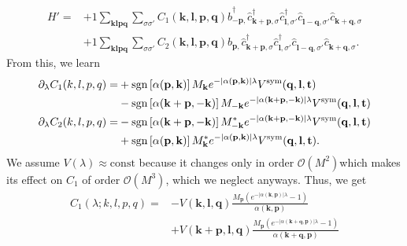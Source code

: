 \begin{align*}
	H'= 	&+1 \sum_{ \mathbf{k} \mathbf{l} \mathbf{p} \mathbf{q} } \sum_{ \sigma \sigma' } C_1( \mathbf{k}, \mathbf{l}, \mathbf{p}, \mathbf{q} )   \hat{b}_{ -\mathbf{p}, }^\dagger  \hat{c}_{ \mathbf{k}+\mathbf{p}, \sigma }^\dagger  \hat{c}_{ \mathbf{l}, \sigma' }^\dagger  \hat{c}_{ \mathbf{l}-\mathbf{q}, \sigma' }^{\phantom{\dagger}} \hat{c}_{ \mathbf{k}+\mathbf{q}, \sigma }^{\phantom{\dagger}}  \\
	&+1 \sum_{ \mathbf{k} \mathbf{l} \mathbf{p} \mathbf{q} } \sum_{ \sigma \sigma' } C_2( \mathbf{k}, \mathbf{l}, \mathbf{p}, \mathbf{q} )   \hat{b}_{ \mathbf{p}, }^{\phantom{\dagger}} \hat{c}_{ \mathbf{k}+\mathbf{p}, \sigma }^\dagger  \hat{c}_{ \mathbf{l}, \sigma' }^\dagger  \hat{c}_{ \mathbf{l}-\mathbf{q}, \sigma' }^{\phantom{\dagger}} \hat{c}_{ \mathbf{k}+\mathbf{q}, \sigma }^{\phantom{\dagger}} 
. \end{align*}
From this, we learn \begin{align*}
	\partial_\lambda C_1(k,l,p,q) =&+ \operatorname{sgn} \left[\alpha (\mathbf{p}, \mathbf{k})\right] M_{\mathbf{k}} e^{ - | \alpha (\mathbf{p},\mathbf{k}) | \lambda } V^\mathrm{sym}( \mathbf{q}, \mathbf{l}, \mathbf{t} ) \\
	&- \operatorname{sgn} \left[\alpha (\mathbf{k}+\mathbf{p}, -\mathbf{k})\right] M_{-\mathbf{k}} e^{ - | \alpha (\mathbf{k}+\mathbf{p},-\mathbf{k}) | \lambda } V^\mathrm{sym}( \mathbf{q}, \mathbf{l}, \mathbf{t} ) \\
	\partial_\lambda C_2(k,l,p,q) =& -\operatorname{sgn} \left[ \alpha (\mathbf{k}+\mathbf{p}, -\mathbf{k}) \right] M_{-\mathbf{k}}^* e^{ - | \alpha (\mathbf{k}+\mathbf{p},-\mathbf{k}) | \lambda } V^\mathrm{sym}( \mathbf{q}, \mathbf{l}, \mathbf{t} ) \\
	&+ \operatorname{sgn} \left[ \alpha (\mathbf{p}, \mathbf{k}) \right] M_{\mathbf{k}}^* e^{ - | \alpha (\mathbf{p},\mathbf{k}) | \lambda } V^\mathrm{sym}( \mathbf{q}, \mathbf{l}, \mathbf{t} ) . \end{align*}
We assume $V(\lambda) \approx \mathrm{const}$ because it changes only in order $\mathcal{O}(M^2)$which makes its effect on $C_1$ of order $\mathcal{O}(M^3)$, which we neglect anyways. Thus, we get \begin{align*}
	C_1(\lambda; k, l, p, q) =&- V(\mathbf{k}, \mathbf{l}, \mathbf{q}) \frac{M_{\mathbf{p}} \left(  e^{ - | \alpha (\mathbf{k},\mathbf{p}) | \lambda } - 1 \right) }{\alpha (\mathbf{k}, \mathbf{p})}\\
		& + V(\mathbf{k}+\mathbf{p}, \mathbf{l}, \mathbf{q}) \frac{M_{\mathbf{p}} \left(  e^{ - | \alpha (\mathbf{k}+\mathbf{q},\mathbf{p}) | \lambda } - 1 \right)}{\alpha (\mathbf{k}+\mathbf{q}, \mathbf{p})}\end{align*}
